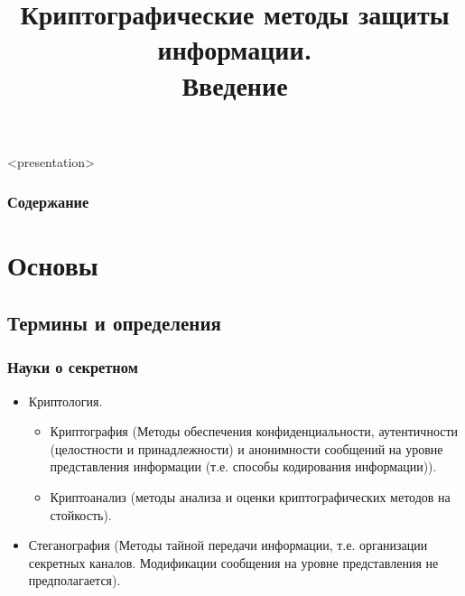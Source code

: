 
\title[Криптография. Введение]{Криптографические методы защиты информации.\\ Введение}





\begin{frame}<presentation>
    \frametitle{Содержание}
    \tableofcontents
\end{frame}


\section{Основы}


\subsection{Термины и определения}


\begin{frame}
    \frametitle{Науки о секретном}

    \begin{itemize}
        \item \alert{Криптология}.
            \begin{itemize}
                \item \alert{Криптография} (Методы обеспечения конфиденциальности, аутентичности (целостности и принадлежности) и анонимности сообщений на уровне представления информации (т.е. способы кодирования информации)).
                \item \alert{Криптоанализ} (методы анализа и оценки криптографических методов на стойкость).
            \end{itemize}            
        \item \alert{Стеганография} (Методы тайной передачи информации, т.е. организации секретных каналов. Модификации сообщения на уровне представления не предполагается).
    \end{itemize}
\end{frame}


